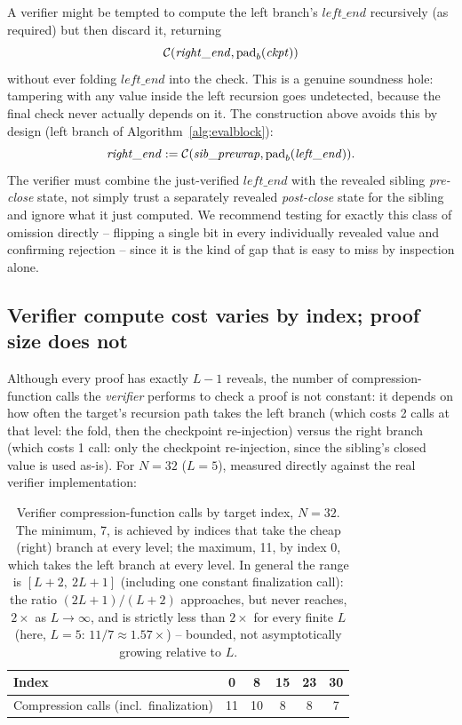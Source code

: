 \begin{remark}
\label{rem:prewrap-bug}
A verifier might be tempted to compute the left branch's
$\mathit{left\_end}$ recursively (as required) but then discard it,
returning
\[
\mathcal{C}(\mathit{right\_end}, \mathrm{pad}_b(\mathit{ckpt}))
\]
without ever folding $\mathit{left\_end}$ into the check. This is a
genuine soundness hole: tampering with any value inside the left recursion
goes undetected, because the final check never actually depends on it.
The construction above avoids this by design (left branch of Algorithm~\ref{alg:evalblock}):
\[
\mathit{right\_end} := \mathcal{C}(\mathit{sib\_prewrap}, \mathrm{pad}_b(\mathit{left\_end})).
\]
The verifier must combine
the just-verified $\mathit{left\_end}$ with the revealed sibling
\emph{pre-close} state, not simply trust a separately revealed
\emph{post-close} state for the sibling and ignore what it just computed.
We recommend testing for exactly this class of omission directly --
flipping a single bit in every individually revealed value and confirming
rejection -- since it is the kind of gap that is easy to miss by
inspection alone.
\end{remark}

\subsection{Verifier compute cost varies by index; proof size does not}
\label{sec:algorithm-cost}

Although every proof has exactly $L-1$ reveals, the number of
compression-function calls the \emph{verifier} performs to check a proof is
not constant: it depends on how often the target's recursion path takes the
left branch (which costs 2 calls at that level: the fold, then the
checkpoint re-injection) versus the right branch (which costs 1 call: only
the checkpoint re-injection, since the sibling's closed value is used
as-is). For $N=32$ ($L=5$), measured directly against the real verifier
implementation:

\begin{table}[htbp]
\centering
\begin{tabular}{@{}lccccc@{}}
\toprule
Index & 0 & 8 & 15 & 23 & 30 \\
\midrule
Compression calls (incl.\ finalization) & 11 & 10 & 8 & 8 & 7 \\
\bottomrule
\end{tabular}
\caption{Verifier compression-function calls by target index, $N=32$. The
minimum, 7, is achieved by indices that take the cheap (right) branch at
every level; the maximum, 11, by index 0, which takes the left branch at
every level. In general the range is $[L+2,\ 2L+1]$ (including one constant
finalization call): the ratio $(2L+1)/(L+2)$ approaches, but never reaches,
$2\times$ as $L \to \infty$, and is strictly less than $2\times$ for every
finite $L$ (here, $L=5$: $11/7 \approx 1.57\times$) -- bounded, not
asymptotically growing relative to $L$.}
\label{tab:verifier-cost}
\end{table}

